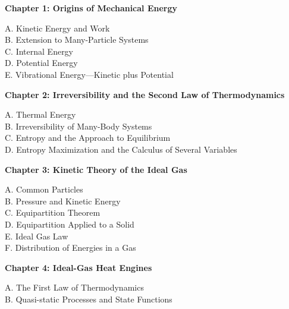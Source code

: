 \documentclass[12pt]{article}
\title{}
\author{Jerich Lee}
\date{\today}
\theoremstyle{definition} %
\theoremstyle{plain} %
\begin{document}
\maketitle
\noindent \textbf{Chapter 1: Origins of Mechanical Energy}

\noindent A. Kinetic Energy and Work \\
\noindent B. Extension to Many-Particle Systems \\
\noindent C. Internal Energy \\
\noindent D. Potential Energy \\
\noindent E. Vibrational Energy---Kinetic plus Potential 

\vspace{1em}

\noindent \textbf{Chapter 2: Irreversibility and the Second Law of Thermodynamics}

\noindent A. Thermal Energy \\
\noindent B. Irreversibility of Many-Body Systems \\
\noindent C. Entropy and the Approach to Equilibrium \\
\noindent D. Entropy Maximization and the Calculus of Several Variables 

\vspace{1em}

\noindent \textbf{Chapter 3: Kinetic Theory of the Ideal Gas}

\noindent A. Common Particles \\
\noindent B. Pressure and Kinetic Energy \\
\noindent C. Equipartition Theorem \\
\noindent D. Equipartition Applied to a Solid \\
\noindent E. Ideal Gas Law \\
\noindent F. Distribution of Energies in a Gas 

\vspace{1em}

\noindent \textbf{Chapter 4: Ideal-Gas Heat Engines}

\noindent A. The First Law of Thermodynamics \\
\noindent B. Quasi-static Processes and State Functions 
\end{document}
